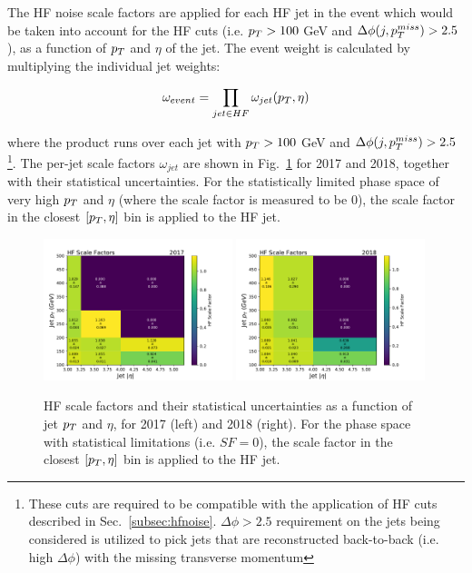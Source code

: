 The HF noise scale factors are applied for each HF jet in the event which would be taken into account for the HF cuts (i.e. $p_T > 100$ GeV 
and $\Delta\phi(j,p_T^{miss}) > 2.5$), as a function of $p_T$ and $\eta$ of the jet. The event weight is calculated by multiplying the individual jet weights:

\begin{equation}
    \omega_{event} = \prod_{jet \in HF} \omega_{jet} (p_T, \eta)
\end{equation}

where the product runs over each jet with $p_T > 100$ GeV and $\Delta\phi(j,p_T^{miss}) > 2.5$\footnote{These cuts are required
to be compatible with the application of HF cuts described in Sec.~\ref{subsec:hfnoise}. $\Delta\phi > 2.5$ requirement on
the jets being considered is utilized to pick jets that are reconstructed back-to-back (i.e. high $\Delta\phi$) with the missing
transverse momentum}.
The per-jet scale factors $\omega_{jet}$ are shown in Fig.~\ref{fig:hf_scale_factors} for 2017 and 2018, together with their statistical uncertainties. 
For the statistically limited phase space of very high $p_T$ and $\eta$ (where the scale factor is measured to be $0$), 
the scale factor in the closest $[ p_T, \eta ]$ bin is applied to the HF jet.

\begin{figure}[ht!]
    \begin{center}
        \includegraphics[width=0.49\textwidth]{ScaleFactors/HFCuts/hf_sf_2017.pdf}
        \includegraphics[width=0.49\textwidth]{ScaleFactors/HFCuts/hf_sf_2018.pdf}
        \caption{
            HF scale factors and their statistical uncertainties as a function of jet $p_T$ and $\eta$, for 2017 (left) and 2018 (right). 
            For the phase space with statistical limitations (i.e. $SF=0$), the scale factor in the closest $[ p_T, \eta ]$ bin is applied to the HF jet.
          }
        \label{fig:hf_scale_factors}
    \end{center}
\end{figure}

